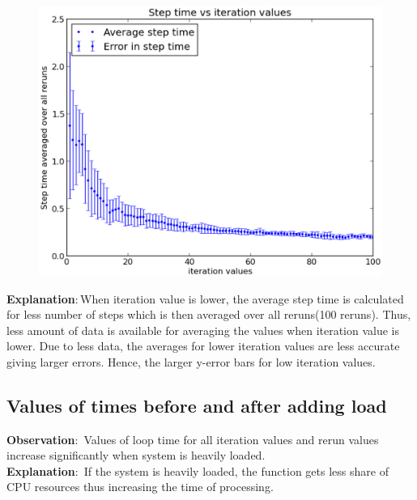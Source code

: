 \documentclass[a4paper,11pt]{article}
\begin{document}
{{\begin{figure}[h]
    \centering
    \includegraphics[scale = 0.5]{plot5}
\end{figure}



\indent \textbf{Explanation}$:$When iteration value is lower, the average step time is calculated for less number of steps
 which is then averaged over all reruns(100 reruns). Thus, less amount of data is available for averaging the
 values when iteration value is lower. Due to less data, the averages for lower iteration values are less accurate
 giving larger errors. Hence, the larger y-error bars for low iteration values.
}

\subsection{Values of times before and after adding load}
{
\indent \indent \textbf{Observation}$:$ Values of loop time for all iteration values and rerun values increase significantly when system is heavily loaded.\\

\indent \textbf{Explanation}$:$ If the system is heavily loaded, the function gets less share of CPU resources thus increasing the time of processing.\\

}}
\end{document}
